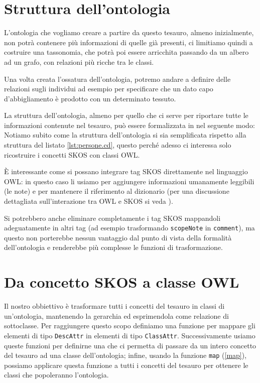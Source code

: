 \section{Struttura dell'ontologia}
L'ontologia che vogliamo creare a partire da questo tesauro, almeno inizialmente, non potrà contenere più informazioni di quelle già presenti, ci limitiamo quindi a costruire una tassonomia, che potrà poi essere arricchita passando da un albero ad un grafo, con relazioni più ricche tra le classi. 

Una volta creata l'ossatura dell'ontologia, potremo andare a definire delle relazioni sugli individui ad esempio per specificare che un dato capo d'abbigliamento è prodotto con un determinato tessuto.

La struttura dell'ontologia, almeno per quello che ci serve per riportare tutte le informazioni contenute nel tesauro, può essere formalizzata in \cduce nel seguente modo:
Notiamo subito come la struttura dell'ontologia si sia semplificata rispetto alla struttura del listato \ref{lst:persone.cd}, questo perché adesso ci interessa solo ricostruire i concetti SKOS con classi OWL.

È interessante come si possano integrare tag SKOS direttamente nel linguaggio OWL: in questo caso li usiamo per aggiungere informazioni umanamente leggibili (le note) e per mantenere il riferimento al dizionario (per una discussione dettagliata sull'interazione tra OWL e SKOS si veda \cite{OWL&SKOS}).

Si potrebbero anche eliminare completamente i tag SKOS mappandoli adeguatamente in altri tag (ad esempio trasformando \verb|scopeNote| in \verb|comment|), ma questo non porterebbe nessun vantaggio dal punto di vista della formalità dell'ontologia e renderebbe più complesse le funzioni di trasformazione.

\section{Da concetto SKOS a classe OWL}
Il nostro obbiettivo è trasformare tutti i concetti del tesauro in classi di un'ontologia, mantenendo la gerarchia ed esprimendola come relazione di sottoclasse. Per raggiungere questo scopo definiamo una funzione per mappare gli elementi di tipo \verb|DescAttr| in elementi di tipo \verb|ClassAttr|. Successivamente usiamo queste funzioni per definirne una che ci permetta di passare da un intero concetto del tesauro ad una classe dell'ontologia; infine, usando la funzione \verb|map| (\ref{map}), possiamo applicare questa funzione a tutti i concetti del tesauro per ottenere le classi che popoleranno l'ontologia.
